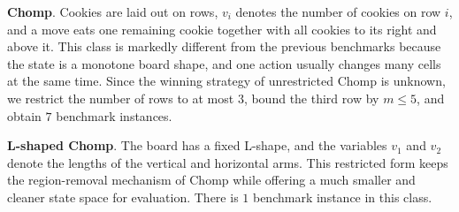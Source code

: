 \documentclass[review]{elsarticle}
\newcommand{\set}[1]{\{ #1 \}}
\newcommand{\tuple}[1]{\langle {#1} \rangle}
\newcommand{\true}{\top}
\newcommand{\statevar}{\mathcal{X}}
\newcommand{\act}{\mathcal{A}}
\newcommand{\constraint}{\mathcal{C}}
\newcommand{\estate}{\mathcal{E}}
\newcommand{\pre}{\mathtt{pre}}
\newcommand{\eff}{\mathtt{eff}}
\begin{document}
\textbf{Chomp}. Cookies are laid out on rows, $v_i$ denotes the number of cookies on row $i$, and a move eats one remaining cookie together with all cookies to its right and above it.
This class is markedly different from the previous benchmarks because the state is a monotone board shape, and one action usually changes many cells at the same time.
Since the winning strategy of unrestricted Chomp is unknown, we restrict the number of rows to at most $3$, bound the third row by $m \le 5$, and obtain $7$ benchmark instances.

\textbf{L-shaped Chomp}. The board has a fixed L-shape, and the variables $v_1$ and $v_2$ denote the lengths of the vertical and horizontal arms.
This restricted form keeps the region-removal mechanism of Chomp while offering a much smaller and cleaner state space for evaluation.
There is $1$ benchmark instance in this class.
\end{document}
